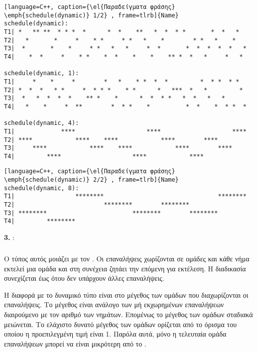 \begin{lstlisting}[language=C++, caption={\el{Παραδείγματα φράσης} \emph{schedule(dynamic)} 1/2} , frame=tlrb]{Name}
schedule(dynamic):
T1| *   ** **  * * *  *      *  *    **   *  *  * *       *  *   *  
T2|   *       *     *    * *     * *   *    *        * *   *    *   
T3|  *       *    *     * *   *   *     *  *       *  *  *  *  *   *    
T4|    *  *     *    * *    *  *    *    *    ** *  *   *     *   *                 

schedule(dynamic, 1): 
T1|     *    *     *        *   *    * *  *  *         *  * *  * *  
T2| *  *  *   * *     *  * * *    * *      *   ***  *   *         * 
T3|  *   *  *  *  *    ** *    *      *  *  * *   *  *   *   *  
T4|   *    *     *  **        *  * *    *          *  *    *  * *  *

schedule(dynamic, 4):   
T1|             ****                    ****                    ****
T2| ****            ****    ****            ****        ****        
T3|     ****            ****    ****            ****        ****    
T4|         ****                    ****            ****             
\end{lstlisting}
\clearpage
\begin{lstlisting}[language=C++, caption={\el{Παραδείγματα φράσης} \emph{schedule(dynamic)} 2/2} , frame=tlrb]{Name}
schedule(dynamic, 8):   
T1|                 ********                                ********
T2|                         ********        ********                
T3| ********                        ********        ********        
T4|         ********                                                
\end{lstlisting}

\textbf{3. }: 
\subparagraph{}
Ο τύπος αυτός μοιάζει με τον \emph{}. Οι επαναλήψεις χωρίζονται σε ομάδες και κάθε νήμα εκτελεί μια ομάδα
και στη συνέχεια ζητάει την επόμενη για εκτέλεση. Η διαδικασία συνεχίζεται έως ότου δεν υπάρχουν άλλες επαναλήψεις.

Η διαφορά με το δυναμικό τύπο είναι στο μέγεθος των ομάδων που διαχωρίζονται οι επαναλήψεις. Το μέγεθος είναι ανάλογο των μή εκχωρημένων επαναλήψεων διαιρούμενο με τον αριθμό των νημάτων. Επομένως το μέγεθος των ομάδων σταδιακά μειώνεται. Το ελάχιστο δυνατό μέγεθος των ομάδων ορίζεται από το όρισμα \emph{} του οποίου η προεπιλεγμένη τιμή είναι 1. Παρόλα αυτά, μόνο η τελευταία ομάδα επαναλήψεων μπορεί να είναι μικρότερη από το \emph{}.


